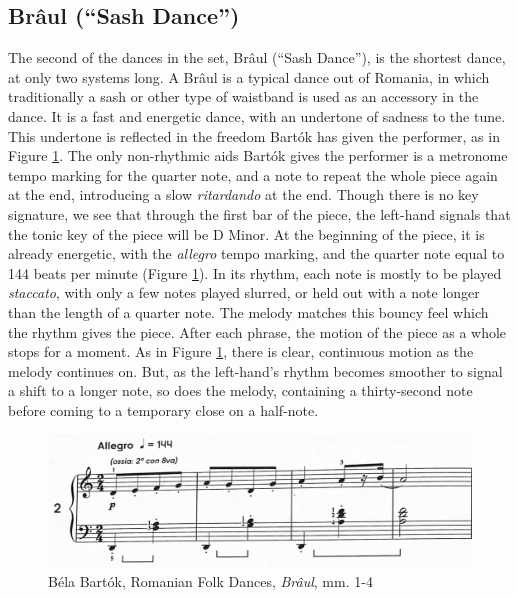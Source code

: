 \subsection{Brâul (``Sash Dance'')}

The second of the dances in the set, Brâul (``Sash Dance''), is the shortest dance, at only two systems long. A Brâul is a typical dance out of Romania, in which traditionally a sash or other type of waistband is used as an accessory in the dance. It is a fast and energetic dance, with an undertone of sadness to the tune. This undertone is reflected in the freedom Bartók has given the performer, as in Figure \ref{fig:bartok-waistband-dance-interpretation}\autocite{Lung_2016}. The only non-rhythmic aids Bartók gives the performer is a metronome tempo marking for the quarter note, and a note to repeat the whole piece again at the end, introducing a slow \textit{ritardando} at the end. Though there is no key signature, we see that through the first bar of the piece, the left-hand signals that the tonic key of the piece will be D Minor. At the beginning of the piece, it is already energetic, with the \textit{allegro} tempo marking, and the quarter note equal to 144 beats per minute (Figure \ref{fig:bartok-waistband-dance-interpretation}\autocite{Lung_2016}). In its rhythm, each note is mostly to be played \textit{staccato}, with only a few notes played slurred, or held out with a note longer than the length of a quarter note. The melody matches this bouncy feel which the rhythm gives the piece. After each phrase, the motion of the piece as a whole stops for a moment. As in Figure \ref{fig:bartok-waistband-dance-interpretation}\autocite{Lung_2016}, there is clear, continuous motion as the melody continues on. But, as the left-hand's rhythm becomes smoother to signal a shift to a longer note, so does the melody, containing a thirty-second note before coming to a temporary close on a half-note. 

\begin{figure}[h]
  \centering
  \includegraphics[width=\textwidth]{figures/bartok-waistband-dance-tempo-marking-and-dynamic.jpg}
  \caption{Béla Bartók, Romanian Folk Dances, \textit{Brâul}, mm. 1-4}
  \label{fig:bartok-waistband-dance-interpretation}
\end{figure}


